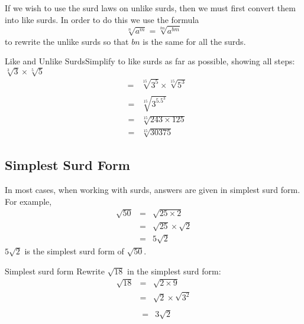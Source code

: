 If we wish to use the surd laws on unlike surds, then we must first convert
them into like surds. In order to do this we use the formula
\begin{equation} 
\label{eq:mn:s:like}
\sqrt[n]{a^m}=\sqrt[bn]{a^{bm}}
\end{equation}
to rewrite the unlike surds so that $bn$ is the same for all the surds.

\begin{wex}{Like and Unlike Surds}{Simplify to like surds as far as possible, showing all steps:  $\sqrt[3]{3}\times \sqrt[5]{5}$}{
\begin{eqnarray*}
&=&\sqrt[15]{3^5}\times \sqrt[15]{5^3}\\
\end{eqnarray*}
\begin{eqnarray*}
&=&\sqrt[15]{3^5.5^3}\\
&=&\sqrt[15]{243\times 125}\\
&=&\sqrt[15]{30 375}
\end{eqnarray*}
}
\end{wex}

\subsection{Simplest Surd Form}
In most cases, when working with surds, answers are given in simplest surd form.
For example,
\begin{eqnarray*}
\sqrt{50} &=& \sqrt{25 \times 2}\\
&=& \sqrt{25}\times \sqrt{2}\\
&=& 5\sqrt{2}
\end{eqnarray*}
$5\sqrt{2}$ is the simplest surd form of $\sqrt{50}$.

\begin{wex}{Simplest surd form}
{Rewrite $\sqrt{18}$ in the simplest surd form:}{
\begin{eqnarray*}
\sqrt{18}&=& \sqrt{2 \times 9}\\
&=&\sqrt{2}\times \sqrt{3^{2}}\\
\end{eqnarray*}
\begin{eqnarray*}
 &=&3\sqrt{2}
\end{eqnarray*}
}
\end{wex}

